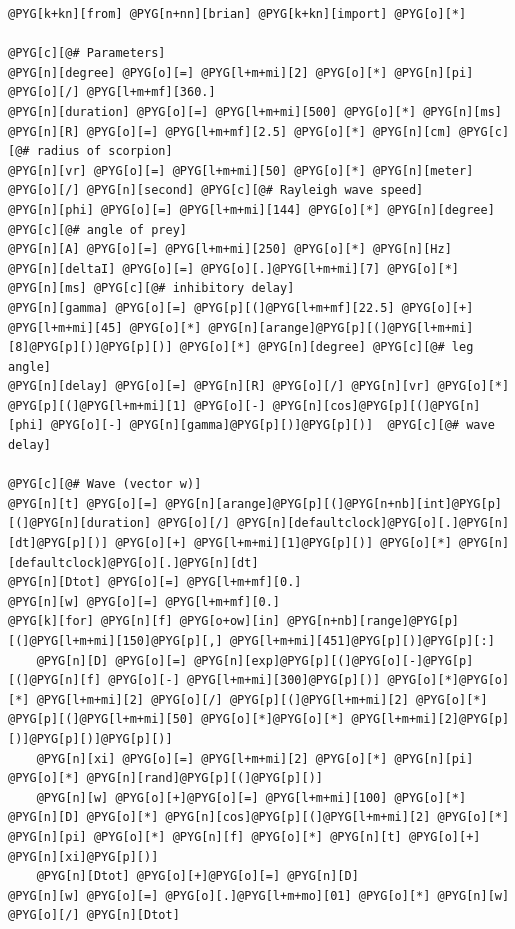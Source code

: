 \documentclass[letterpaper,10pt,english]{manual}
\begin{document}
\begin{Verbatim}[commandchars=@\[\]]
@PYG[k+kn][from] @PYG[n+nn][brian] @PYG[k+kn][import] @PYG[o][*]

@PYG[c][@# Parameters]
@PYG[n][degree] @PYG[o][=] @PYG[l+m+mi][2] @PYG[o][*] @PYG[n][pi] @PYG[o][/] @PYG[l+m+mf][360.]
@PYG[n][duration] @PYG[o][=] @PYG[l+m+mi][500] @PYG[o][*] @PYG[n][ms]
@PYG[n][R] @PYG[o][=] @PYG[l+m+mf][2.5] @PYG[o][*] @PYG[n][cm] @PYG[c][@# radius of scorpion]
@PYG[n][vr] @PYG[o][=] @PYG[l+m+mi][50] @PYG[o][*] @PYG[n][meter] @PYG[o][/] @PYG[n][second] @PYG[c][@# Rayleigh wave speed]
@PYG[n][phi] @PYG[o][=] @PYG[l+m+mi][144] @PYG[o][*] @PYG[n][degree] @PYG[c][@# angle of prey]
@PYG[n][A] @PYG[o][=] @PYG[l+m+mi][250] @PYG[o][*] @PYG[n][Hz]
@PYG[n][deltaI] @PYG[o][=] @PYG[o][.]@PYG[l+m+mi][7] @PYG[o][*] @PYG[n][ms] @PYG[c][@# inhibitory delay]
@PYG[n][gamma] @PYG[o][=] @PYG[p][(]@PYG[l+m+mf][22.5] @PYG[o][+] @PYG[l+m+mi][45] @PYG[o][*] @PYG[n][arange]@PYG[p][(]@PYG[l+m+mi][8]@PYG[p][)]@PYG[p][)] @PYG[o][*] @PYG[n][degree] @PYG[c][@# leg angle]
@PYG[n][delay] @PYG[o][=] @PYG[n][R] @PYG[o][/] @PYG[n][vr] @PYG[o][*] @PYG[p][(]@PYG[l+m+mi][1] @PYG[o][-] @PYG[n][cos]@PYG[p][(]@PYG[n][phi] @PYG[o][-] @PYG[n][gamma]@PYG[p][)]@PYG[p][)]  @PYG[c][@# wave delay]

@PYG[c][@# Wave (vector w)]
@PYG[n][t] @PYG[o][=] @PYG[n][arange]@PYG[p][(]@PYG[n+nb][int]@PYG[p][(]@PYG[n][duration] @PYG[o][/] @PYG[n][defaultclock]@PYG[o][.]@PYG[n][dt]@PYG[p][)] @PYG[o][+] @PYG[l+m+mi][1]@PYG[p][)] @PYG[o][*] @PYG[n][defaultclock]@PYG[o][.]@PYG[n][dt]
@PYG[n][Dtot] @PYG[o][=] @PYG[l+m+mf][0.]
@PYG[n][w] @PYG[o][=] @PYG[l+m+mf][0.]
@PYG[k][for] @PYG[n][f] @PYG[o+ow][in] @PYG[n+nb][range]@PYG[p][(]@PYG[l+m+mi][150]@PYG[p][,] @PYG[l+m+mi][451]@PYG[p][)]@PYG[p][:]
    @PYG[n][D] @PYG[o][=] @PYG[n][exp]@PYG[p][(]@PYG[o][-]@PYG[p][(]@PYG[n][f] @PYG[o][-] @PYG[l+m+mi][300]@PYG[p][)] @PYG[o][*]@PYG[o][*] @PYG[l+m+mi][2] @PYG[o][/] @PYG[p][(]@PYG[l+m+mi][2] @PYG[o][*] @PYG[p][(]@PYG[l+m+mi][50] @PYG[o][*]@PYG[o][*] @PYG[l+m+mi][2]@PYG[p][)]@PYG[p][)]@PYG[p][)]
    @PYG[n][xi] @PYG[o][=] @PYG[l+m+mi][2] @PYG[o][*] @PYG[n][pi] @PYG[o][*] @PYG[n][rand]@PYG[p][(]@PYG[p][)]
    @PYG[n][w] @PYG[o][+]@PYG[o][=] @PYG[l+m+mi][100] @PYG[o][*] @PYG[n][D] @PYG[o][*] @PYG[n][cos]@PYG[p][(]@PYG[l+m+mi][2] @PYG[o][*] @PYG[n][pi] @PYG[o][*] @PYG[n][f] @PYG[o][*] @PYG[n][t] @PYG[o][+] @PYG[n][xi]@PYG[p][)]
    @PYG[n][Dtot] @PYG[o][+]@PYG[o][=] @PYG[n][D]
@PYG[n][w] @PYG[o][=] @PYG[o][.]@PYG[l+m+mo][01] @PYG[o][*] @PYG[n][w] @PYG[o][/] @PYG[n][Dtot]


\end{Verbatim}
\end{document}
